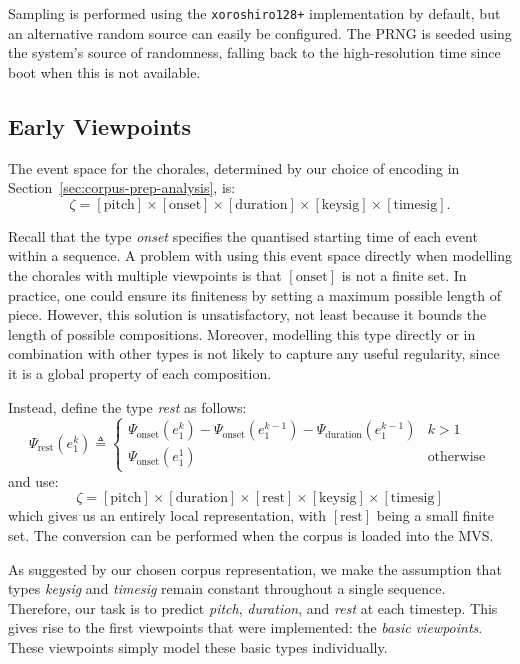 \documentclass[12pt,a4paper,twoside,openright]{report}
\begin{document}
Sampling is performed using the \texttt{xoroshiro128+} implementation by
default, but an alternative random source can easily be configured. The PRNG is
seeded using the system's source of randomness, falling back to the
high-resolution time since boot when this is not available.

\subsection{Early Viewpoints}

The event space for the chorales, determined by our choice of encoding in
Section~\ref{sec:corpus-prep-analysis}, is:
$$ \zeta = [\mathrm{pitch}] \times [\mathrm{onset}] \times [\mathrm{duration}]
\times [\mathrm{keysig}] \times [\mathrm{timesig}]. $$

Recall that the type \emph{onset} specifies the quantised starting time of each
event within a sequence. A problem with using this event space directly when
modelling the chorales with multiple viewpoints is that $[\mathrm{onset}]$ is
not a finite set. In practice, one could ensure its finiteness by setting a
maximum possible length of piece. However, this solution is unsatisfactory, not
least because it bounds the length of possible compositions. Moreover, modelling
this type directly or in combination with other types is not likely to capture
any useful regularity, since it is a global property of each composition.

Instead, define the type \emph{rest} as follows:
$$ \Psi_{\mathrm{rest}}(e_1^k) \triangleq \begin{cases} 
  \Psi_{\mathrm{onset}}(e_1^k) -
  \Psi_{\mathrm{onset}}(e_1^{k-1}) - \Psi_{\mathrm{duration}}(e_1^{k-1}) & k > 1 \\
  \Psi_{\mathrm{onset}}(e_1^1) & \text{otherwise}
\end{cases} $$
and use:
$$ \zeta = [\mathrm{pitch}] \times [\mathrm{duration}] \times [\mathrm{rest}]
\times [\mathrm{keysig}] \times [\mathrm{timesig}] $$
which gives us an entirely local representation, with $[\mathrm{rest}]$ being a
small finite set. The conversion can be performed when the corpus is loaded into
the MVS. 

As suggested by our chosen corpus representation, we make the assumption that
types \emph{keysig} and \emph{timesig} remain constant throughout a single
sequence. Therefore, our task is to predict \emph{pitch}, \emph{duration}, and
\emph{rest} at each timestep. This gives rise to the first viewpoints that were
implemented: the \emph{basic viewpoints}. These viewpoints simply model
these basic types individually.
\end{document}
